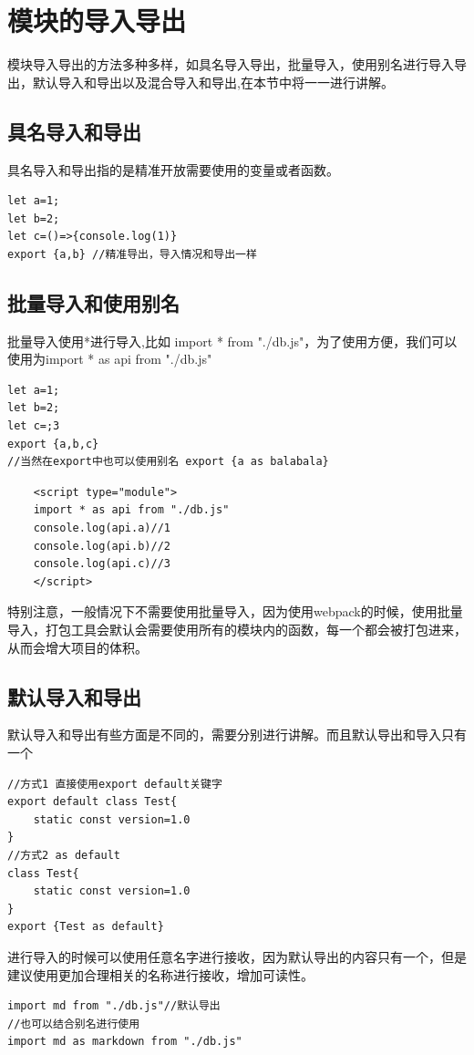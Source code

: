 \documentclass[
	11pt,
	fleqn,
	a4paper,
]{LegrandOrangeBook}
\begin{document}
\section{模块的导入导出}
模块导入导出的方法多种多样，如具名导入导出，批量导入，使用别名进行导入导出，默认导入和导出以及混合导入和导出,在本节中将一一进行讲解。
\subsection{具名导入和导出}
具名导入和导出指的是精准开放需要使用的变量或者函数。
\begin{verbatim}
let a=1;
let b=2;
let c=()=>{console.log(1)}
export {a,b} //精准导出，导入情况和导出一样
\end{verbatim}
\subsection{批量导入和使用别名}
批量导入使用*进行导入,比如 import * from "./db.js"，为了使用方便，我们可以使用为import * as api from "./db.js"
\begin{verbatim}
let a=1;
let b=2;
let c=;3
export {a,b,c}
//当然在export中也可以使用别名 export {a as balabala}
\end{verbatim}
\begin{verbatim}
    <script type="module">
    import * as api from "./db.js"
    console.log(api.a)//1
    console.log(api.b)//2
    console.log(api.c)//3
    </script>
\end{verbatim}
\begin{remark}
    特别注意，一般情况下不需要使用批量导入，因为使用webpack的时候，使用批量导入，打包工具会默认会需要使用所有的模块内的函数，每一个都会被打包进来，从而会增大项目的体积。
\end{remark}
\subsection{默认导入和导出}
默认导入和导出有些方面是不同的，需要分别进行讲解。而且默认导出和导入只有一个
\begin{verbatim}
//方式1 直接使用export default关键字
export default class Test{
    static const version=1.0
}
//方式2 as default
class Test{
    static const version=1.0
}
export {Test as default}
\end{verbatim}
进行导入的时候可以使用任意名字进行接收，因为默认导出的内容只有一个，但是建议使用更加合理相关的名称进行接收，增加可读性。
\begin{verbatim}
import md from "./db.js"//默认导出
//也可以结合别名进行使用
import md as markdown from "./db.js"
\end{verbatim}
\end{document}
